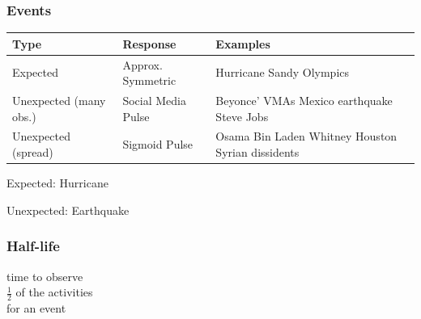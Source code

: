 \documentclass{beamer}
\begin{document}

\begin{frame}\frametitle{Events}
\begin{table}
\begin{tabular}{ m{2cm} | m{ 2.5cm} | m{4cm}}
\hline
Type & Response & Examples \\ \hline
Expected    & Approx. \newline Symmetric & Hurricane Sandy \newline Olympics \\ \hline
Unexpected (many obs.) & Social Media \newline Pulse & Beyonce' VMAs \newline  Mexico earthquake \newline  Steve Jobs \\ \hline
Unexpected (spread) & Sigmoid \newline Pulse & Osama Bin Laden \newline  Whitney Houston \newline  Syrian dissidents \\ \hline
\end{tabular}
\end{table}
\end{frame}



\begin{frame}
\begin{center}
{\Huge Expected: Hurricane}
\end{center}
\end{frame}


\begin{frame}
\begin{center}
{\Huge Unexpected: Earthquake}
\end{center}
\end{frame}


\begin{frame}\frametitle{Half-life}
\begin{center}
{\Huge time to observe \\[6pt] $\frac{1}{2}$ of the activities \\[6pt] for an event}
\end{center}
\end{frame}
\end{document}
